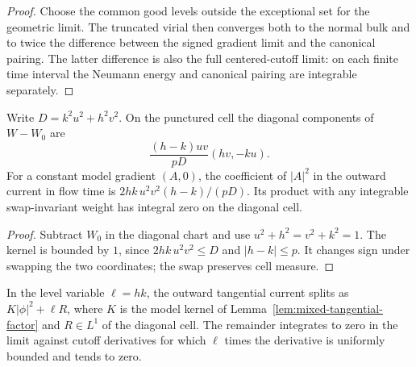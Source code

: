 \begin{proof}
\leanok
Choose the common good levels outside the exceptional set for the geometric
limit. The truncated virial then converges both to the normal bulk and to
twice the difference between the signed gradient limit and the canonical
pairing. The latter difference is also the full centered-cutoff limit:
on each finite time interval the Neumann energy and canonical pairing
are integrable separately.
\end{proof}

\begin{lemma}
\label{lem:mixed-tangential-factor}
\leanok
Write $D=k^2u^2+h^2v^2$. On the punctured cell the diagonal components of
$W-W_0$ are
\[
  \frac{(h-k)uv}{pD}(hv,-ku).
\]
For a constant model gradient $(A,0)$, the coefficient of $|A|^2$ in the
outward current in flow time is $2hk\,u^2v^2(h-k)/(pD)$. Its product
with any integrable swap-invariant weight has integral zero on the
diagonal cell.
\end{lemma}

\begin{proof}
\leanok
Subtract $W_0$ in the diagonal chart and use $u^2+h^2=v^2+k^2=1$.
The kernel is bounded by $1$, since $2hk\,u^2v^2\le D$ and
$|h-k|\le p$. It changes sign under swapping the two coordinates;
the swap preserves cell measure.
\end{proof}

\begin{lemma}
\label{lem:mixed-tangential-current}
\leanok
In the level variable $\ell=hk$, the outward tangential current splits
as $K|\phi|^2+\ell R$, where $K$ is the model kernel of
Lemma~\ref{lem:mixed-tangential-factor} and $R\in L^1$ of the diagonal cell.
The remainder integrates to zero in the limit against cutoff derivatives
for which $\ell$ times the derivative is uniformly bounded and tends to zero.
\end{lemma}

